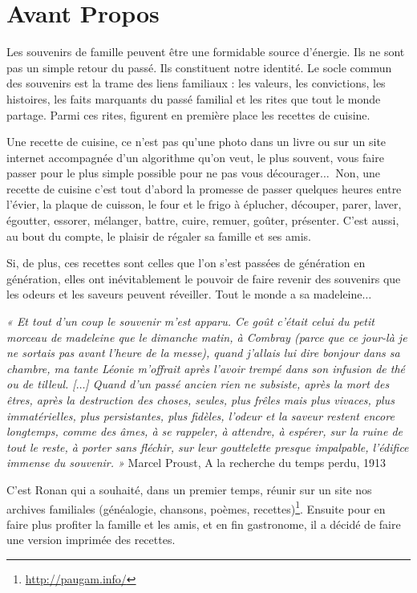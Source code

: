 \section*{Avant Propos}
Les souvenirs de famille peuvent être une formidable source d’énergie. Ils ne sont pas un simple retour du passé. Ils constituent notre identité. Le socle commun des souvenirs est la trame des liens familiaux : les valeurs, les convictions, les histoires, les faits marquants du passé familial et les rites que tout le monde partage. Parmi ces rites, figurent en première place les recettes de cuisine.

Une recette de cuisine, ce n’est pas qu’une photo dans un livre ou sur un site internet accompagnée d’un algorithme qu’on veut, le plus souvent, vous faire passer pour le plus simple possible pour ne pas vous décourager$\ldots~$ Non, une recette de cuisine c’est tout d'abord la promesse de passer quelques heures entre l’évier, la plaque de cuisson, le four et le frigo à éplucher, découper, parer, laver, égoutter, essorer, mélanger, battre, cuire, remuer, goûter, présenter. 
C'est aussi, au bout du compte, le plaisir de régaler sa famille et ses amis. 

Si, de plus, ces recettes sont celles que l’on s’est passées de génération en génération, elles ont inévitablement le pouvoir de faire revenir des souvenirs que les odeurs et les saveurs peuvent réveiller. Tout le monde a sa madeleine$\ldots$

\textit{« Et tout d'un coup le souvenir m'est apparu. Ce goût c'était celui du petit morceau de madeleine que le dimanche matin, à Combray (parce que ce jour-là je ne sortais pas avant l'heure de la messe), quand j'allais lui dire bonjour dans sa chambre, ma tante Léonie m'offrait après l'avoir trempé dans son infusion de thé ou de tilleul. [$\ldots$] Quand d'un passé ancien rien ne subsiste, après la mort des êtres, après la destruction des choses, seules, plus frêles mais plus vivaces, plus immatérielles, plus persistantes, plus fidèles, l'odeur et la saveur restent encore longtemps, comme des âmes, à se rappeler, à attendre, à espérer, sur la ruine de tout le reste, à porter sans fléchir, sur leur gouttelette presque impalpable, l'édifice immense du souvenir. »} Marcel Proust, A la recherche du temps perdu, 1913

C’est Ronan qui a souhaité, dans un premier temps, réunir sur un site nos archives familiales (généalogie, chansons, poèmes, recettes)\footnote{\url{http://paugam.info/}}. Ensuite pour en faire plus profiter la famille et les amis, et en fin gastronome, il a décidé de faire une version imprimée des recettes. 
      
